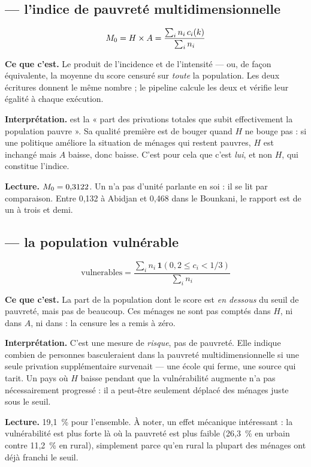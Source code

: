 \documentclass[11pt,a4paper]{article}
\begin{document}
\subsection*{ --- l'indice de pauvreté multidimensionnelle}

\[
M_{0} = H \times A = \frac{\sum_i n_i \, c_i(k)}{\sum_i n_i}
\]

\textbf{Ce que c'est.} Le produit de l'incidence et de l'intensité --- ou, de façon équivalente,
la moyenne du score censuré sur \emph{toute} la population. Les deux écritures donnent le même
nombre ; le pipeline calcule les deux et vérifie leur égalité à chaque exécution.

\textbf{Interprétation.} \ipm{} est la « part des privations totales que subit effectivement la
population pauvre ». Sa qualité première est de bouger quand $H$ ne bouge pas : si une politique
améliore la situation de ménages qui restent pauvres, $H$ est inchangé mais $A$ baisse, donc \ipm{}
baisse. C'est pour cela que c'est \emph{lui}, et non $H$, qui constitue l'indice.

\textbf{Lecture.} $M_{0} = 0{,}3122$. Un \ipm{} n'a pas d'unité parlante en soi : il se lit par
comparaison. Entre 0,132 à Abidjan et 0,468 dans le Bounkani, le rapport est de un à trois et demi.

\subsection*{ --- la population vulnérable}

\[
\text{vulnerables} = \frac{\sum_i n_i \, \mathbf{1}\!\left(0{,}2 \le c_i < 1/3\right)}{\sum_i n_i}
\]

\textbf{Ce que c'est.} La part de la population dont le score est \emph{en dessous} du seuil de
pauvreté, mais pas de beaucoup. Ces ménages ne sont pas comptés dans $H$, ni dans $A$, ni dans
\ipm{} : la censure les a remis à zéro.

\textbf{Interprétation.} C'est une mesure de \emph{risque}, pas de pauvreté. Elle indique combien
de personnes basculeraient dans la pauvreté multidimensionnelle si une seule privation
supplémentaire survenait --- une école qui ferme, une source qui tarit. Un pays où $H$ baisse
pendant que la vulnérabilité augmente n'a pas nécessairement progressé : il a peut-être seulement
déplacé des ménages juste sous le seuil.

\textbf{Lecture.} 19,1~\% pour l'ensemble. À noter, un effet mécanique intéressant : la
vulnérabilité est plus forte là où la pauvreté est plus faible (26,3~\% en urbain contre 11,2~\%
en rural), simplement parce qu'en rural la plupart des ménages ont déjà franchi le seuil.
\end{document}
